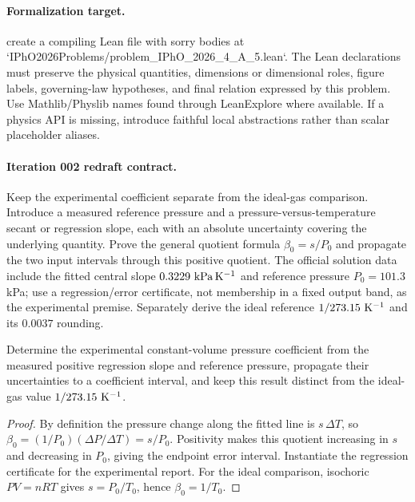 \paragraph{Formalization target.}
create a compiling Lean file with sorry bodies at `IPhO2026Problems/problem\_IPhO\_2026\_4\_A\_5.lean`. The Lean declarations must preserve the physical quantities, dimensions or dimensional roles, figure labels, governing-law hypotheses, and final relation expressed by this problem.
Use Mathlib/Physlib names found through LeanExplore where available. If a physics API is missing, introduce faithful local abstractions rather than scalar placeholder aliases.

\paragraph{Iteration 002 redraft contract.}
Keep the experimental coefficient separate from the ideal-gas comparison.
Introduce a measured reference pressure and a pressure-versus-temperature
secant or regression slope, each with an absolute uncertainty covering the
underlying quantity.  Prove the general quotient formula
\(\beta_0=s/P_0\) and propagate the two input intervals through this positive
quotient.  The official solution data include the fitted central slope
\(0.3229\ {\rm kPa\,K^{-1}}\) and reference pressure
\(P_0=101.3\) kPa; use a regression/error certificate, not membership in a
fixed output band, as the experimental premise.  Separately derive the ideal
reference \(1/273.15\ {\rm K^{-1}}\) and its \(0.0037\) rounding.

\begin{theorem}
  \label{thm:physics:IPhO_2026_4_A_5:target}
  Determine the experimental constant-volume pressure coefficient from the
  measured positive regression slope and reference pressure, propagate their
  uncertainties to a coefficient interval, and keep this result distinct
  from the ideal-gas value \(1/273.15\ {\rm K^{-1}}\).
\end{theorem}
\begin{proof}
  By definition the pressure change along the fitted line is
  \(s\,\Delta T\), so \(\beta_0=(1/P_0)(\Delta P/\Delta T)=s/P_0\).
  Positivity makes this quotient increasing in \(s\) and decreasing in
  \(P_0\), giving the endpoint error interval.  Instantiate the regression
  certificate for the experimental report.  For the ideal comparison,
  isochoric \(PV=nRT\) gives \(s=P_0/T_0\), hence
  \(\beta_0=1/T_0\).
\end{proof}

